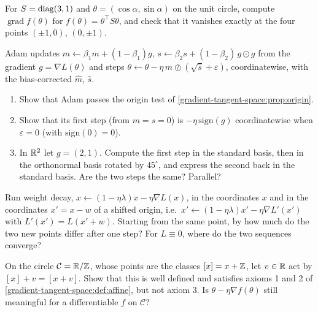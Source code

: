 \begin{notechapter}
\begin{exercise}\label{gradient-tangent-space:exr:3}
For $S = \operatorname{diag}(3, 1)$ and $\theta = (\cos\alpha, \sin\alpha)$ on the unit circle, compute $\operatorname{grad}f(\theta)$ for
$f(\theta) = \theta^\top S\theta$, and check that it vanishes exactly at the four points $(\pm1,0)$, $(0,\pm1)$.
\end{exercise}

\begin{exercise}\label{gradient-tangent-space:exr:4}
Adam updates $m\leftarrow\beta_1m + (1 - \beta_1)g$, $s\leftarrow\beta_2s + (1 - \beta_2)\,g\odot g$ from the gradient $g = \nabla L(\theta)$ and steps
$\theta\leftarrow\theta - \eta\,\hat m\oslash(\sqrt{\hat s} + \varepsilon)$, coordinatewise, with the bias-corrected $\hat m$, $\hat s$.
\begin{enumerate}[nosep]
  \item Show that Adam passes the origin test of \cref{gradient-tangent-space:prop:origin}.
  \item Show that its first step (from $m = s = 0$) is $-\eta\,\mathrm{sign}(g)$ coordinatewise when $\varepsilon = 0$
        (with $\mathrm{sign}(0) = 0$).
  \item In $\mathbb{R}^2$ let $g = (2, 1)$. Compute the first step in the standard basis, then in the orthonormal
        basis rotated by $45^\circ$, and express the second back in the standard basis. Are the two steps
        the same? Parallel?
\end{enumerate}
\end{exercise}

\begin{exercise}\label{gradient-tangent-space:exr:5}
Run weight decay, $x\leftarrow(1 - \eta\lambda)x - \eta\nabla L(x)$, in the coordinates $x$ and in the coordinates $x' = x - w$
of a shifted origin, i.e.\ $x'\leftarrow(1 - \eta\lambda)x' - \eta\nabla L'(x')$ with $L'(x') = L(x' + w)$. Starting from the same
point, by how much do the two new points differ after one step? For $L\equiv0$, where do the two
sequences converge?
\end{exercise}

\begin{exercise}\label{gradient-tangent-space:exr:6}
On the circle $\mathcal C = \mathbb{R}/\mathbb{Z}$, whose points are the classes $[x] = x + \mathbb{Z}$, let $v\in\mathbb{R}$ act by $[x] + v = [x + v]$.
Show that this is well defined and satisfies axioms 1 and 2 of
\cref{gradient-tangent-space:def:affine}, but not axiom 3. Is $\theta - \eta\nabla f(\theta)$ still meaningful for a
differentiable $f$ on $\mathcal C$?
\end{exercise}
\end{notechapter}
